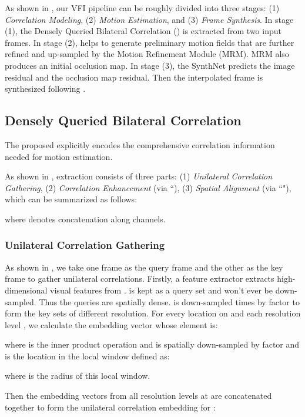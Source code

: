 \documentclass{article}
\begin{document}
As shown in , our VFI pipeline can be roughly divided into three stages: (1) \textit{Correlation Modeling}, (2) \textit{Motion Estimation}, and (3) \textit{Frame Synthesis}. In stage (1), the Densely Queried Bilateral Correlation () is extracted from two input frames. In stage (2),  helps to generate preliminary motion fields that are further refined and up-sampled by the Motion Refinement Module (MRM). MRM also produces an initial occlusion map. In stage (3), the SynthNet predicts the image residual and the occlusion map residual. Then the interpolated frame is synthesized following .

\subsection{Densely Queried Bilateral Correlation}

The proposed  explicitly encodes the comprehensive correlation information needed for motion estimation.

As shown in ,  extraction consists of three parts: (1) \textit{Unilateral Correlation Gathering}, (2) \textit{Correlation Enhancement} (via ``), (3) \textit{Spatial Alignment} (via ``"), which can be summarized as follows:

where  denotes concatenation along channels.

\subsubsection{Unilateral Correlation Gathering}
As shown in , we take one frame as the query frame and the other as the key frame to gather unilateral correlations. Firstly, a feature extractor  extracts high-dimensional visual features  from .  is kept as a query set and won't ever be down-sampled. Thus the queries are spatially dense.  is down-sampled  times by factor  to form the key sets of different resolution. For every location  on  and each resolution level , we calculate the embedding vector  whose  element is:

where  is the inner product operation and  is spatially down-sampled  by factor  and  is the  location in the local window  defined as:

where  is the radius of this local window.

Then the embedding vectors from all resolution levels at  are concatenated together to form the unilateral correlation embedding for :
\end{document}
